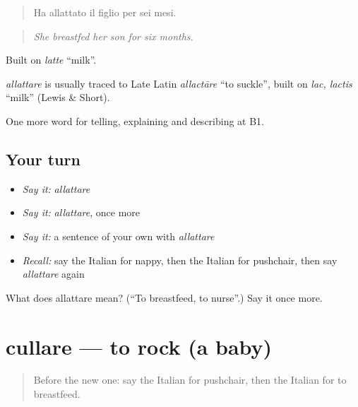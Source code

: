 \begin{quote}
Ha allattato il figlio per sei mesi.
\end{quote}

\begin{quote}
\emph{She breastfed her son for six months.}
\end{quote}

Built on \emph{latte} \textquotedblleft{}milk\textquotedblright{}.

\begin{cousinweb}
\emph{allattare} is usually traced to Late Latin \emph{allactāre} \textquotedblleft{}to suckle\textquotedblright{}, built on \emph{lac, lactis} \textquotedblleft{}milk\textquotedblright{} (Lewis \& Short).
\end{cousinweb}

\begin{grammarlens}[title={What you've built}]
One more word for telling, explaining and describing at B1.
\end{grammarlens}

\subsection*{Your turn}
\begin{itemize}
\raggedright
  \item \emph{Say it:} \emph{allattare}
  \item \emph{Say it:} \emph{allattare}, once more
  \item \emph{Say it:} a sentence of your own with \emph{allattare}
  \item \emph{Recall:} say the Italian for nappy, then the Italian for pushchair, then say \emph{allattare} again
\end{itemize}

\begin{tcolorbox}[breakable,colback=teal!4,colframe=teal!35!black,title={Before you move on}]
What does allattare mean? (\textquotedblleft{}To breastfeed, to nurse\textquotedblright{}.) Say it once more.
\end{tcolorbox}
\section[cullare]{cullare — to rock (a baby)}

\label{lesson:IT-C496-cullare}



\begin{quote}
Before the new one: say the Italian for pushchair, then the Italian for to breastfeed.
\end{quote}

